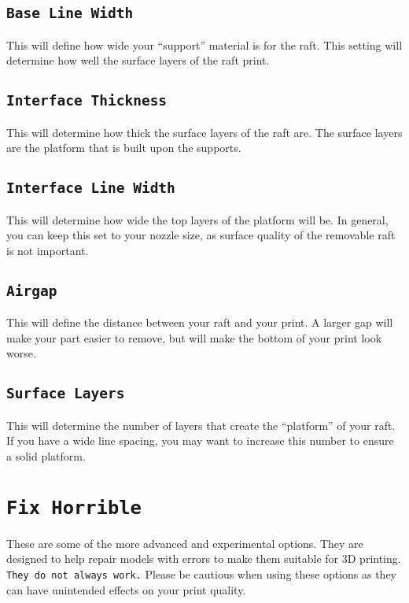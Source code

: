 \subsection{\texttt{Base Line Width}}
This will define how wide your “support” material is for the raft. This setting will determine how well the surface layers of the raft print.

\subsection{\texttt{Interface Thickness}}
This will determine how thick the surface layers of the raft are. The surface layers are the platform that is built upon the supports.

\subsection{\texttt{Interface Line Width}}
This will determine how wide the top layers of the platform will be. In general, you can keep this set to your nozzle size, as surface quality of the removable raft is not important.

\subsection{\texttt{Airgap}}
This will define the distance between your raft and your print. A larger gap will make your part easier to remove, but will make the bottom of your print look worse.

\subsection{\texttt{Surface Layers}}
This will determine the number of layers that create the “platform” of your raft. If you have a wide line spacing, you may want to increase this number to ensure a solid platform. 

\section{\texttt{Fix Horrible}}
These are some of the more advanced and experimental options. They are designed to help repair models with errors to make them suitable for 3D printing. \texttt{They do not always work.} Please be cautious when using these options as they can have unintended effects on your print quality.

